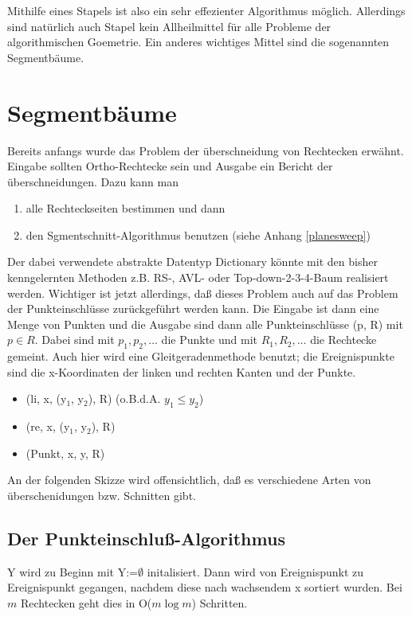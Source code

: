 \documentclass[ngerman,draft,parskip=half*,twoside]{scrreprt}
\theoremstyle{break}
\begin{document}
Mithilfe eines Stapels ist also ein sehr effezienter Algorithmus möglich. Allerdings sind natürlich auch Stapel kein Allheilmittel
für alle Probleme der algorithmischen Goemetrie. Ein anderes wichtiges Mittel sind die sogenannten Segmentbäume.

\section{Segmentbäume}
Bereits anfangs wurde das Problem der überschneidung von Rechtecken erwähnt. Eingabe sollten Ortho-Rechtecke sein und Ausgabe ein
Bericht der überschneidungen. Dazu kann man
\begin{enumerate}
\item alle Rechteckseiten bestimmen und dann
\item den Sgmentschnitt-Algorithmus benutzen (siehe Anhang \ref{planesweep})
\end{enumerate}

Der dabei verwendete abstrakte Datentyp Dictionary könnte mit den bisher kenngelernten Methoden z.B. RS-, AVL- oder
Top-down-2-3-4-Baum realisiert werden.
Wichtiger ist jetzt allerdings, daß dieses Problem auch auf das Problem der Punkteinschlüsse zurückgeführt werden kann. Die Eingabe
ist dann eine Menge von Punkten und die Ausgabe sind dann alle Punkteinschlüsse (p, R) mit $p  \in  R$. Dabei sind mit $p_1,   p_2,
  \ldots$ die Punkte und mit $R_1,   R_2,   \ldots$ die Rechtecke gemeint. Auch hier wird eine Gleitgeradenmethode benutzt; die
Ereignispunkte sind die x-Koordinaten der linken und rechten Kanten und der Punkte.
\begin{itemize}
\item[] (li, x, (y$_1$, y$_2$), R) \hspace{2cm} (o.B.d.A. $y_1 \leq y_2$)\vspace{-0.5ex}
\item[] (re, x, (y$_1$, y$_2$), R) \vspace{-0.5ex}
\item[] (Punkt, x, y, R)
\end{itemize}

An der folgenden Skizze wird offensichtlich, daß es verschiedene Arten von überschenidungen bzw. Schnitten gibt. 
\begin{figure}[H]
\centering


\end{figure}

\subsection{Der Punkteinschluß-Algorithmus}
Y wird zu Beginn  mit Y:=$\emptyset$ initalisiert. Dann wird von Ereignispunkt zu Ereignispunkt gegangen, nachdem diese nach wachsendem
x sortiert wurden. Bei $m$ Rechtecken geht dies in O($m \log m$) Schritten.
\end{document}
